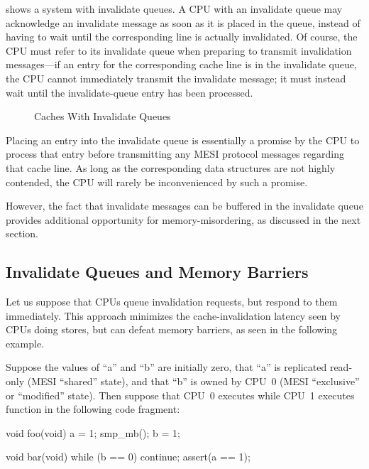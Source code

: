 shows a system with invalidate queues.
A CPU with an invalidate queue may acknowledge an invalidate message
as soon as it is placed in the queue, instead of having to wait until
the corresponding line is actually invalidated.
Of course, the CPU must refer to its invalidate queue when preparing
to transmit invalidation messages---if an entry for the corresponding
cache line is in the invalidate queue, the CPU cannot immediately
transmit the invalidate message; it must instead wait until the
invalidate-queue entry has been processed.

\begin{figure}
\centering
{}
\caption{Caches With Invalidate Queues}
\label{fig:app:whymb:Caches With Invalidate Queues}
\end{figure}

Placing an entry into the invalidate queue is essentially a promise
by the CPU to process that entry before transmitting any MESI protocol
messages regarding that cache line.
As long as the corresponding data structures are not highly contended,
the CPU will rarely be inconvenienced by such a promise.

However, the fact that invalidate messages can be buffered in the
invalidate queue provides additional opportunity for memory-misordering,
as discussed in the next section.

\subsection{Invalidate Queues and Memory Barriers}
\label{sec:app:whymb:Invalidate Queues and Memory Barriers}

Let us suppose that CPUs queue invalidation requests, but respond to
them immediately.
This approach minimizes the cache-invalidation latency seen by CPUs
doing stores, but can defeat memory barriers, as seen in the following
example.

Suppose the values of ``a'' and ``b'' are initially zero,
that ``a'' is replicated read-only (MESI ``shared'' state),
and that ``b''
is owned by CPU~0 (MESI ``exclusive'' or ``modified'' state).
Then suppose that CPU~0 executes  while CPU~1 executes
function  in the following code fragment:

\begin{fcvlabel}
\begin{VerbatimN}[fontsize=\footnotesize,samepage=true,commandchars=\\\[\]]
void foo(void)
{
	a = 1;
	smp_mb();	\lnlbl[mb]
	b = 1;
}

void bar(void)
{
	while (b == 0) continue;
	assert(a == 1);
}
\end{VerbatimN}
\end{fcvlabel}

